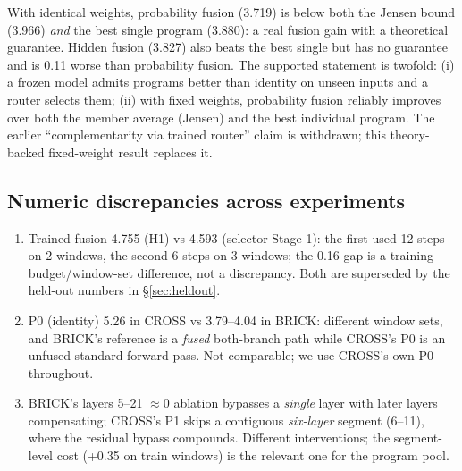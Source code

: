 \documentclass[11pt,a4paper]{article}
\begin{document}
With identical weights, probability fusion (3.719) is below both the Jensen
bound (3.966) \emph{and} the best single program (3.880): a real fusion gain
with a theoretical guarantee. Hidden fusion (3.827) also beats the best single
but has no guarantee and is 0.11 worse than probability fusion. The supported
statement is twofold: (i) a frozen model admits programs better than identity on
unseen inputs and a router selects them; (ii) with fixed weights, probability
fusion reliably improves over both the member average (Jensen) and the best
individual program. The earlier ``complementarity via trained router'' claim is
withdrawn; this theory-backed fixed-weight result replaces it.

\subsection{Numeric discrepancies across experiments}
\begin{enumerate}[leftmargin=*]
  \item Trained fusion 4.755 (H1) vs 4.593 (selector Stage 1): the first used 12
        steps on 2 windows, the second 6 steps on 3 windows; the 0.16 gap is a
        training-budget/window-set difference, not a discrepancy. Both are
        superseded by the held-out numbers in \S\ref{sec:heldout}.
  \item P0 (identity) 5.26 in CROSS vs 3.79--4.04 in BRICK: different window sets,
        and BRICK's reference is a \emph{fused} both-branch path while CROSS's P0 is
        an unfused standard forward pass. Not comparable; we use CROSS's own P0
        throughout.
  \item BRICK's layers 5--21 $\approx 0$ ablation bypasses a \emph{single} layer with
        later layers compensating; CROSS's P1 skips a contiguous \emph{six-layer}
        segment (6--11), where the residual bypass compounds. Different
        interventions; the segment-level cost (+0.35 on train windows) is the
        relevant one for the program pool.
\end{enumerate}
\end{document}
